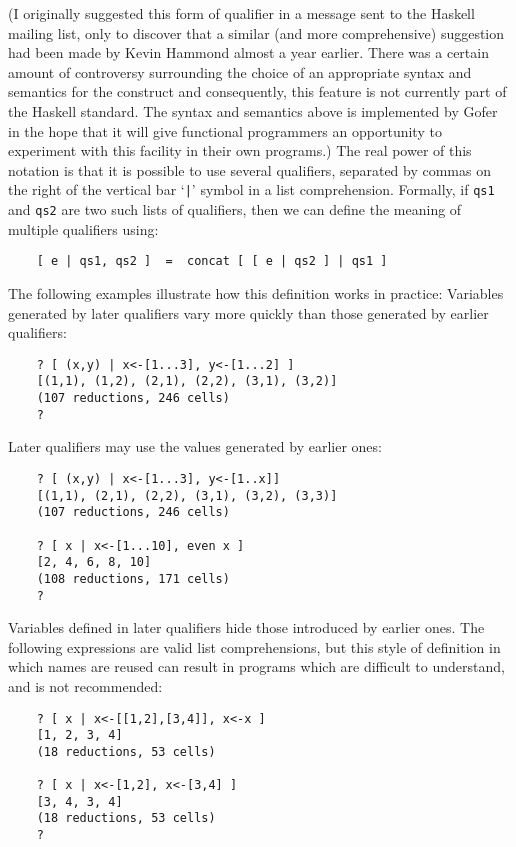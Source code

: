      (I originally suggested this form of qualifier in a message
     sent to the Haskell mailing list, only to discover that a  similar
     (and more comprehensive) suggestion had been made by Kevin Hammond
     almost a year earlier.  There was a certain amount of  controversy
     surrounding the choice of an appropriate syntax and semantics  for
     the construct and consequently, this feature is not currently part
     of the Haskell  standard.   The  syntax  and  semantics  above  is
     implemented by Gofer in the hope  that  it  will  give  functional
     programmers an opportunity to experiment  with  this  facility  in
     their own programs.)
\EI
The real power of this notation is that it is possible to  use  several
qualifiers, separated by commas on the right of the  vertical  bar  `\verb"|"'
symbol in a list comprehension.  Formally, if \verb"qs1" and \verb"qs2" 
are two  such
lists of qualifiers,  then  we  can  define  the  meaning  of  multiple
qualifiers using:
\begin{verbatim}
    [ e | qs1, qs2 ]  =  concat [ [ e | qs2 ] | qs1 ]
\end{verbatim}
The  following  examples  illustrate  how  this  definition  works   in
practice:
\BI
\IT  Variables generated by later qualifiers  vary  more  quickly  than
     those generated by earlier qualifiers:
\begin{verbatim}
    ? [ (x,y) | x<-[1...3], y<-[1...2] ]
    [(1,1), (1,2), (2,1), (2,2), (3,1), (3,2)]
    (107 reductions, 246 cells)
    ?
\end{verbatim}
\IT  Later qualifiers may use the values generated by earlier ones:
\begin{verbatim}
    ? [ (x,y) | x<-[1...3], y<-[1..x]]
    [(1,1), (2,1), (2,2), (3,1), (3,2), (3,3)]
    (107 reductions, 246 cells)

    ? [ x | x<-[1...10], even x ]
    [2, 4, 6, 8, 10]
    (108 reductions, 171 cells)
    ?
\end{verbatim}
\IT  Variables defined in later qualifiers  hide  those  introduced  by
     earlier  ones.   The  following   expressions   are   valid   list
     comprehensions, but this style of definition in  which  names  are
     reused can result in programs which are difficult  to  understand,
     and is not recommended:
\begin{verbatim}
    ? [ x | x<-[[1,2],[3,4]], x<-x ]
    [1, 2, 3, 4]
    (18 reductions, 53 cells)

    ? [ x | x<-[1,2], x<-[3,4] ]
    [3, 4, 3, 4]
    (18 reductions, 53 cells)
    ?
\end{verbatim}
